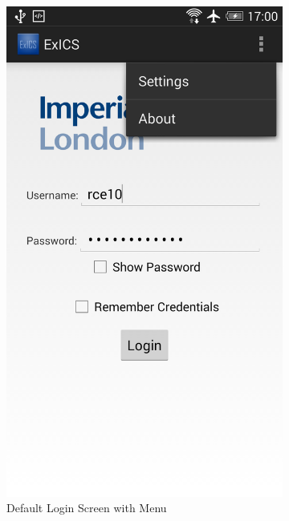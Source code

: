 \begin{figure}[h]
	\centering
	\begin{subfigure}[b]{0.35\textwidth}
		\includegraphics[width=\textwidth]{"screenshots/default_login"}
		\caption{Default Login Screen with Menu}
		\label{subfig:hidepassword}
	\end{subfigure}
	\begin{subfigure}[b]{0.35\textwidth}

\end{subfigure}
\end{figure}
